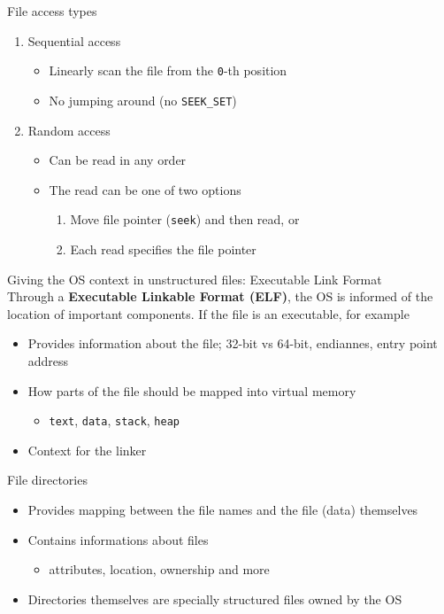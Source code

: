 \documentclass[journal, letterpaper]{IEEEtran}
\begin{document}
\begin{example}{File access types}
    \begin{enumerate}
        \item Sequential access 
        \begin{itemize}
            \item Linearly scan the file from the \verb|0|-th position
            \item No jumping around (no \verb|SEEK_SET|)
        \end{itemize}
        \item Random access
        \begin{itemize}
            \item Can be read in any order
            \item The read can be one of two options
            \begin{enumerate}
                \item Move file pointer (\verb|seek|) and then read, or
                \item Each read specifies the file pointer
            \end{enumerate}
        \end{itemize}
    \end{enumerate}
\end{example}
\begin{aside}{Giving the OS context in unstructured files: Executable Link Format} \\
    Through a \textbf{Executable Linkable Format (ELF)}, the OS is informed of the location of important components. If the file is an executable, for example
    \begin{itemize}
        \item Provides information about the file; 32-bit vs 64-bit, endiannes, entry point address
        \item How parts of the file should be mapped into virtual memory
        \begin{itemize}
            \item \verb|text|, \verb|data|, \verb|stack|, \verb|heap|
        \end{itemize}
        \item Context for the linker
    \end{itemize}
\end{aside}
\begin{example}{File directories} 
    \begin{itemize}
        \item Provides mapping between the file names and the file (data) themselves
        \item Contains informations about files
        \begin{itemize}
            \item attributes, location, ownership and more
        \end{itemize}
        \item Directories themselves are specially structured files owned by the OS
    \end{itemize}
\end{example}
\end{document}
